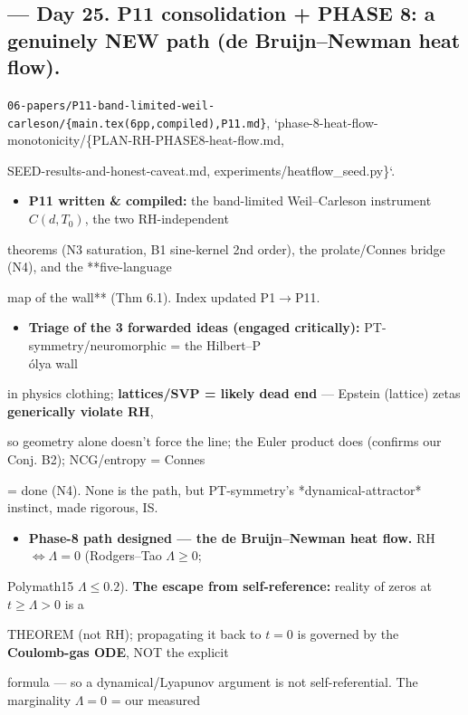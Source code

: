 \documentclass[10pt]{article}
\begin{document}
\subsection*{ --- Day 25. P11 consolidation + PHASE 8: a genuinely NEW path (de Bruijn--Newman heat flow).}
\texttt{06-papers/P11-band-limited-weil-carleson/\{main.tex(6pp,compiled),P11.md\}}, `phase-8-heat-flow-monotonicity/\{PLAN-RH-PHASE8-heat-flow.md,\par
SEED-results-and-honest-caveat.md, experiments/heatflow\_seed.py\}`.\par
\begin{itemize}
\item \textbf{P11 written \& compiled:} the band-limited Weil--Carleson instrument $C(d,T_0)$, the two RH-independent
\end{itemize}
  theorems (N3 saturation, B1 sine-kernel 2nd order), the prolate/Connes bridge (N4), and the **five-language\par
  map of the wall** (Thm 6.1). Index updated P1\ensuremath{\to}P11.\par
\begin{itemize}
\item \textbf{Triage of the 3 forwarded ideas (engaged critically):} PT-symmetry/neuromorphic = the Hilbert--P\\\'olya wall
\end{itemize}
  in physics clothing; \textbf{lattices/SVP = likely dead end} --- Epstein (lattice) zetas \textbf{generically violate RH},\par
  so geometry alone doesn't force the line; the Euler product does (confirms our Conj. B2); NCG/entropy = Connes\par
  = done (N4). None is the path, but PT-symmetry's *dynamical-attractor* instinct, made rigorous, IS.\par
\begin{itemize}
\item \textbf{Phase-8 path designed --- the de Bruijn--Newman heat flow.} RH $\iff\Lambda=0$ (Rodgers--Tao $\Lambda\ge0$;
\end{itemize}
  Polymath15 $\Lambda\le0.2$). \textbf{The escape from self-reference:} reality of zeros at $t\ge\Lambda>0$ is a\par
  THEOREM (not RH); propagating it back to $t=0$ is governed by the \textbf{Coulomb-gas ODE}, NOT the explicit\par
  formula --- so a dynamical/Lyapunov argument is not self-referential. The marginality $\Lambda=0$ = our measured\par
\end{document}
